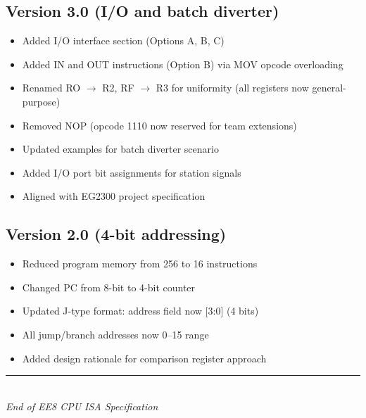 \documentclass[11pt,a4paper]{article}
\begin{document}
\subsection*{Version 3.0 (I/O and batch diverter)}
\begin{itemize}[nosep]
  \item Added I/O interface section (Options A, B, C)
  \item Added IN and OUT instructions (Option B) via MOV opcode overloading
  \item Renamed RO $\rightarrow$ R2, RF $\rightarrow$ R3 for uniformity (all registers now general-purpose)
  \item Removed NOP (opcode 1110 now reserved for team extensions)
  \item Updated examples for batch diverter scenario
  \item Added I/O port bit assignments for station signals
  \item Aligned with EG2300 project specification
\end{itemize}

\subsection*{Version 2.0 (4-bit addressing)}
\begin{itemize}[nosep]
  \item Reduced program memory from 256 to 16 instructions
  \item Changed PC from 8-bit to 4-bit counter
  \item Updated J-type format: address field now [3:0] (4 bits)
  \item All jump/branch addresses now 0--15 range
  \item Added design rationale for comparison register approach
\end{itemize}

\vfill
\begin{center}
\textcolor{ee8gray}{\rule{0.4\textwidth}{0.4pt}}\\[6pt]
\textit{End of EE8 CPU ISA Specification}
\end{center}
\end{document}
